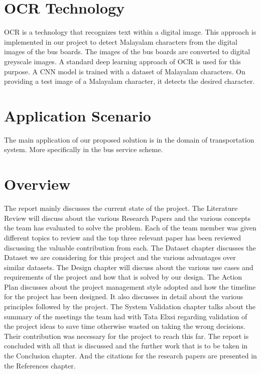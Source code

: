 \documentclass[a4paper,12pt]{report}
\begin{document}
\section{OCR Technology}
OCR is a technology that recognizes text within a digital image. This approach is implemented in our project to detect Malayalam characters from the digital images of the bus boards. The images of the bus boards are converted to digital greyscale images. A standard deep learning approach of OCR is used for this purpose. A CNN model is trained with a dataset of Malayalam characters. On providing a test image of a Malayalam character, it detects the desired character. 

\section{Application Scenario}
The main application of our proposed solution is in the domain of transportation system. More specifically in the bus service scheme. 

\section{Overview}
The report mainly discusses the current state of the project. The Literature Review will discuss about the various Research Papers and the various concepts the team has evaluated to solve the problem. Each of the team member was given diﬀerent topics to review and the top three relevant paper has been reviewed discussing the valuable contribution from each. The Dataset chapter discusses the Dataset we are considering for this project and the various advantages over similar datasets. The Design chapter will discuss about the various use cases and requirements of the project and how that is solved by our design. The Action Plan discusses about the project management style adopted and how the timeline for the project has been designed. It also discusses in detail about the various principles followed by the project. The System Validation chapter talks about the summary of the meetings the team had with Tata Elxsi regarding validation of the project ideas to save time otherwise wasted on taking the wrong decisions. Their contribution was necessary for the project to reach this far. The report is concluded with all that is discussed and the further work that is to be taken in the Conclusion chapter. And the citations for the research papers are presented in the References chapter.

\newpage
\renewcommand\chaptername{CHAPTER}
\end{document}
